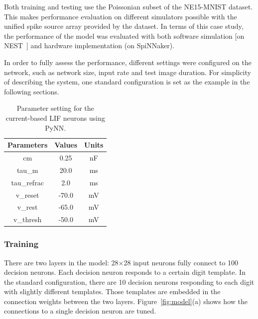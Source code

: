 \documentclass{frontiersENG} %
\begin{document}
Both training and testing use the Poissonian subset of the NE15-MNIST dataset.
This makes performance evaluation on different simulators possible with the unified spike source array provided by the dataset. 
In terms of this case study, the performance of the model was evaluated with both software simulation [on NEST~\citep{gewaltig2007nest}] and hardware implementation (on SpiNNaker).

In order to fully assess the performance, different settings were configured on the network, such as network size, input rate and test image duration.
For simplicity of describing the system, one standard configuration is set as the example in the following sections.

\begin{table}[hbbp]
	\centering
	\caption{\label{tbl:pynnSetting}Parameter setting for the current-based LIF neurons using PyNN.}
	\bgroup
	\def\arraystretch{1.4}
	\begin{tabular}{c c c}
		Parameters & Values & Units \\
		\hline
		cm & 0.25 & nF	\\
		tau\_m & 20.0 & ms\\
		tau\_refrac & 2.0 & ms\\
		v\_reset & -70.0 & mV\\
		v\_rest & -65.0 & mV\\
		v\_thresh & -50.0 & mV\\
	\end{tabular}
	\egroup
\end{table}

\subsubsection{Training}
There are two layers in the model: 28$\times$28 input neurons fully connect to 100 decision neurons.
Each decision neuron responds to a certain digit template.
In the standard configuration, there are 10 decision neurons responding to each digit with slightly different templates.
Those templates are embedded in the connection weights between the two layers.
Figure~\ref{fig:model}(a) shows how the connections to a single decision neuron are tuned.
\end{document}
